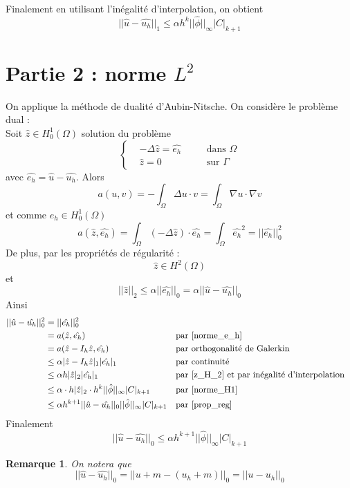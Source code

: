 \documentclass[french]{article}
\newtheorem*{Rem}{Remarque}
\begin{document}
	Finalement en utilisant l'inégalité d'interpolation, on obtient
	\begin{equation}
		\boxed{||\hat{u}-\hat{u_h}||_1\le\alpha h^k ||\hat{\phi}||_\infty |C|_{k+1}}
		\label{norme_H1}
	\end{equation} 

	\section{Partie 2 : norme $L^2$}
	
	On applique la méthode de dualité d'Aubin-Nitsche. On considère le problème dual : \\
	Soit $\hat{z}\in H_0^1(\Omega)$ solution du problème
	$$\left\{\begin{aligned}
		&-\Delta\hat{z}=\hat{e_h} \quad &&\text{dans }\Omega \\
		&\hat{z}=0 \quad &&\text{sur } \Gamma
	\end{aligned}\right.$$
	avec $\hat{e_h}=\hat{u}-\hat{u_h}$.
	Alors
	$$a(u,v)=-\int_\Omega\Delta u\cdot v=\int_\Omega\nabla u\cdot\nabla v$$
	et comme $e_h\in H_0^1(\Omega)$
	\begin{equation}
		a(\hat{z},\hat{e_h})=\int_\Omega(-\Delta \hat{z})\cdot \hat{e_h}=\int_\Omega \hat{e_h}^2=||\hat{e_h}||_0^2
		\label{norme_e_h}
	\end{equation}
	De plus, par les propriétés de régularité : 
	\begin{equation}
		\hat{z}\in H^2(\Omega)
		\label{z_H_2}
	\end{equation}
	et
	\begin{equation}
		||\hat{z}||_2\le \alpha||\hat{e_h}||_0 =\alpha||\hat{u}-\hat{u_h}||_0
		\label{prop_reg}
	\end{equation}
	Ainsi
	\begin{align*}
		||\hat{u}-\hat{u_h}||_0^2&=||\hat{e_h}||_0^2 \\
		&=a(\hat{z},\hat{e_h}) &&\text{par \ref{norme_e_h}} \\
		&=a(\hat{z}-I_h\hat{z},\hat{e_h}) &&\text{par orthogonalité de Galerkin} \\
		&\le\alpha|\hat{z}-I_h\hat{z}|_1|\hat{e_h}|_1 &&\text{par continuité} \\
		&\le\alpha h|\hat{z}|_2|\hat{e_h}|_1 &&\text{par \ref{z_H_2} et par inégalité d'interpolation} \\
		&\le\alpha \cdot h|\hat{z}|_2 \cdot h^k||\hat{\phi}||_\infty |C|_{k+1} &&\text{par \ref{norme_H1}} \\
		&\le\alpha h^{k+1}||\hat{u}-\hat{u_h}||_0||\hat{\phi}||_\infty |C|_{k+1} &&\text{par \ref{prop_reg}}
	\end{align*}
	Finalement
	\begin{equation}
		\boxed{||\hat{u}-\hat{u_h}||_0\le\alpha h^{k+1}||\hat{\phi}||_\infty |C|_{k+1}}
	\end{equation}

	\begin{Rem}
		On notera que
		$$||\hat{u}-\hat{u_h}||_0=||u+m-(u_h+m)||_0=||u-u_h||_0$$
	\end{Rem}
\end{document}
